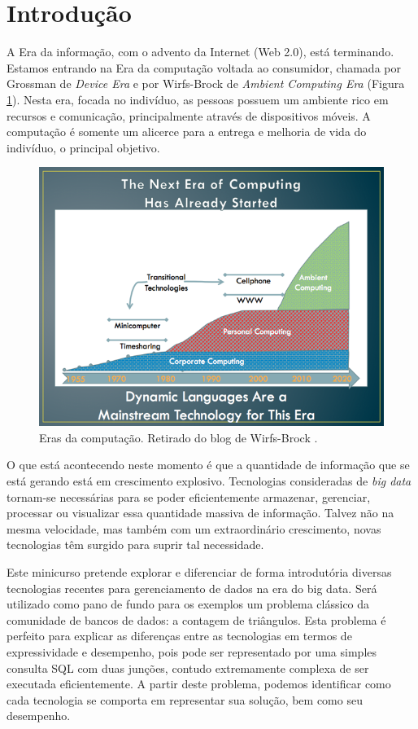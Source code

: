 \section{Introdução}

A Era da informação, com o advento da Internet (Web 2.0), está terminando. Estamos entrando na
Era da computação voltada ao consumidor, chamada por Grossman de \textit{Device Era}
\cite{grossman2012structure} e por Wirfs-Brock de 
\emph{Ambient Computing Era} \cite{wirfsbrock2011blog} (Figura \ref{fig:ambientcomputing_era}). 
Nesta era, focada no indivíduo, as pessoas possuem um ambiente rico em recursos e comunicação, 
principalmente através de dispositivos móveis. A computação é somente um alicerce para a entrega 
e melhoria de vida do indivíduo, o principal objetivo.

\begin{figure}[h]
        \centering
        \includegraphics[width=0.7\linewidth]{3eras-medium.png}
        \caption{Eras da computação. Retirado do blog de Wirfs-Brock \cite{wirfsbrock2011blog}.}
        \label{fig:ambientcomputing_era}
\end{figure}


O que está acontecendo neste momento é que a quantidade de informação que se está gerando 
está em crescimento explosivo. Tecnologias consideradas de \emph{big data} tornam-se 
necessárias para se poder eficientemente armazenar, gerenciar, processar ou
visualizar essa quantidade massiva de informação. Talvez não na mesma velocidade, mas 
também com um extraordinário crescimento, novas tecnologias têm surgido para suprir tal
necessidade.

Este minicurso pretende explorar e diferenciar de forma introdutória diversas tecnologias recentes
para gerenciamento de dados na era do big data. Será utilizado como pano de fundo para os
exemplos um problema clássico da comunidade de bancos de dados: a contagem de triângulos.
Esta problema é perfeito para explicar as diferenças entre as tecnologias em termos de
expressividade e desempenho, pois pode ser representado por uma simples consulta SQL com
duas junções, contudo extremamente complexa de ser executada eficientemente. A partir deste
problema, podemos identificar como cada tecnologia se comporta em representar sua solução,
bem como seu desempenho. 

